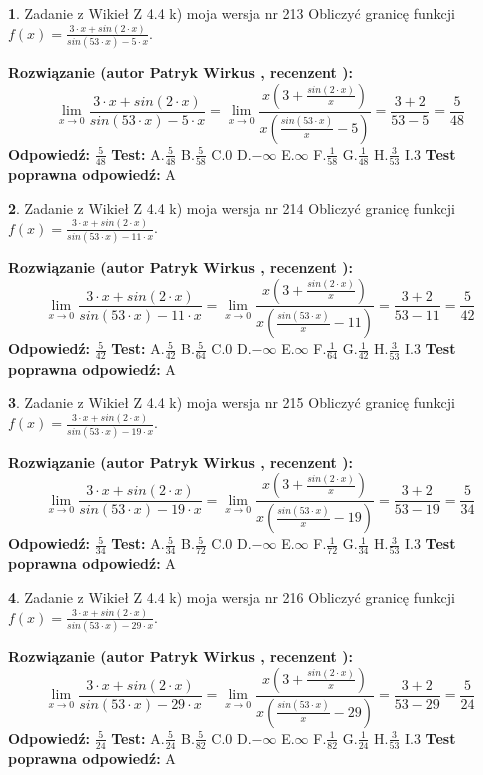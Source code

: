 \documentclass[12pt, a4paper]{article}
\theoremstyle{definition} %
\newtheorem{zad}{}
\newcommand{\zadStart}[1]{\begin{zad}#1\newline}
\newcommand{\zadStop}{\end{zad}}
\newcommand{\rozwStart}[2]{\noindent \textbf{Rozwiązanie (autor #1 , recenzent #2): }\newline}
\newcommand{\rozwStop}{\newline}
\newcommand{\odpStart}{\noindent \textbf{Odpowiedź:}\newline}
\newcommand{\odpStop}{\newline}
\newcommand{\testStart}{\noindent \textbf{Test:}\newline}
\newcommand{\testStop}{\newline}
\newcommand{\kluczStart}{\noindent \textbf{Test poprawna odpowiedź:}\newline}
\newcommand{\kluczStop}{\newline}
\begin{document}
\zadStart{Zadanie z Wikieł Z 4.4 k) moja wersja nr 213}
Obliczyć granicę funkcji $f(x)=\frac{3\cdot x +sin(2\cdot x)}{sin(53\cdot x) -5\cdot x}$.
\zadStop
\rozwStart{Patryk Wirkus}{}
$$\lim\limits_{x\to 0}\frac{3\cdot x +sin(2\cdot x)}{sin(53\cdot x) -5\cdot x}
=\lim\limits_{x\to 0}\frac{x(3+\frac{sin(2\cdot x)}{x})}{x(\frac{sin(53\cdot x)}{x}-5)}
=\frac{3+2}{53-5} = \frac{5}{48}$$
\rozwStop
\odpStart
$\frac{5}{48}$
\odpStop
\testStart
A.$\frac{5}{48}$
B.$\frac{5}{58}$
C.$0$
D.$-\infty$
E.$\infty$
F.$\frac{1}{58}$
G.$\frac{1}{48}$
H.$\frac{3}{53}$
I.$3$
\testStop
\kluczStart
A
\kluczStop



\zadStart{Zadanie z Wikieł Z 4.4 k) moja wersja nr 214}
Obliczyć granicę funkcji $f(x)=\frac{3\cdot x +sin(2\cdot x)}{sin(53\cdot x) -11\cdot x}$.
\zadStop
\rozwStart{Patryk Wirkus}{}
$$\lim\limits_{x\to 0}\frac{3\cdot x +sin(2\cdot x)}{sin(53\cdot x) -11\cdot x}
=\lim\limits_{x\to 0}\frac{x(3+\frac{sin(2\cdot x)}{x})}{x(\frac{sin(53\cdot x)}{x}-11)}
=\frac{3+2}{53-11} = \frac{5}{42}$$
\rozwStop
\odpStart
$\frac{5}{42}$
\odpStop
\testStart
A.$\frac{5}{42}$
B.$\frac{5}{64}$
C.$0$
D.$-\infty$
E.$\infty$
F.$\frac{1}{64}$
G.$\frac{1}{42}$
H.$\frac{3}{53}$
I.$3$
\testStop
\kluczStart
A
\kluczStop



\zadStart{Zadanie z Wikieł Z 4.4 k) moja wersja nr 215}
Obliczyć granicę funkcji $f(x)=\frac{3\cdot x +sin(2\cdot x)}{sin(53\cdot x) -19\cdot x}$.
\zadStop
\rozwStart{Patryk Wirkus}{}
$$\lim\limits_{x\to 0}\frac{3\cdot x +sin(2\cdot x)}{sin(53\cdot x) -19\cdot x}
=\lim\limits_{x\to 0}\frac{x(3+\frac{sin(2\cdot x)}{x})}{x(\frac{sin(53\cdot x)}{x}-19)}
=\frac{3+2}{53-19} = \frac{5}{34}$$
\rozwStop
\odpStart
$\frac{5}{34}$
\odpStop
\testStart
A.$\frac{5}{34}$
B.$\frac{5}{72}$
C.$0$
D.$-\infty$
E.$\infty$
F.$\frac{1}{72}$
G.$\frac{1}{34}$
H.$\frac{3}{53}$
I.$3$
\testStop
\kluczStart
A
\kluczStop



\zadStart{Zadanie z Wikieł Z 4.4 k) moja wersja nr 216}
Obliczyć granicę funkcji $f(x)=\frac{3\cdot x +sin(2\cdot x)}{sin(53\cdot x) -29\cdot x}$.
\zadStop
\rozwStart{Patryk Wirkus}{}
$$\lim\limits_{x\to 0}\frac{3\cdot x +sin(2\cdot x)}{sin(53\cdot x) -29\cdot x}
=\lim\limits_{x\to 0}\frac{x(3+\frac{sin(2\cdot x)}{x})}{x(\frac{sin(53\cdot x)}{x}-29)}
=\frac{3+2}{53-29} = \frac{5}{24}$$
\rozwStop
\odpStart
$\frac{5}{24}$
\odpStop
\testStart
A.$\frac{5}{24}$
B.$\frac{5}{82}$
C.$0$
D.$-\infty$
E.$\infty$
F.$\frac{1}{82}$
G.$\frac{1}{24}$
H.$\frac{3}{53}$
I.$3$
\testStop
\kluczStart
A
\kluczStop
\end{document}
